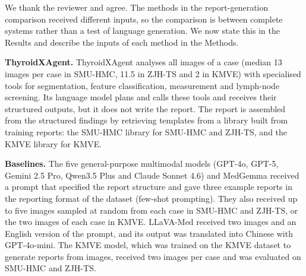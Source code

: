 We thank the reviewer and agree. The methods in the report-generation comparison received different inputs, so the comparison is between complete systems rather than a test of language generation. We now state this in the Results and describe the inputs of each method in the Methods.\par

\textbf{ThyroidXAgent.} ThyroidXAgent analyses all images of a case (median 13 images per case in SMU-HMC, 11.5 in ZJH-TS and 2 in KMVE) with specialised tools for segmentation, feature classification, measurement and lymph-node screening. Its language model plans and calls these tools and receives their structured outputs, but it does not write the report. The report is assembled from the structured findings by retrieving templates from a library built from training reports: the SMU-HMC library for SMU-HMC and ZJH-TS, and the KMVE library for KMVE.\par

\textbf{Baselines.} The five general-purpose multimodal models (GPT-4o, GPT-5, Gemini 2.5 Pro, Qwen3.5 Plus and Claude Sonnet 4.6) and MedGemma received a prompt that specified the report structure and gave three example reports in the reporting format of the dataset (few-shot prompting). They also received up to five images sampled at random from each case in SMU-HMC and ZJH-TS, or the two images of each case in KMVE. LLaVA-Med received two images and an English version of the prompt, and its output was translated into Chinese with GPT-4o-mini. The KMVE model, which was trained on the KMVE dataset to generate reports from images, received two images per case and was evaluated on SMU-HMC and ZJH-TS.\par

